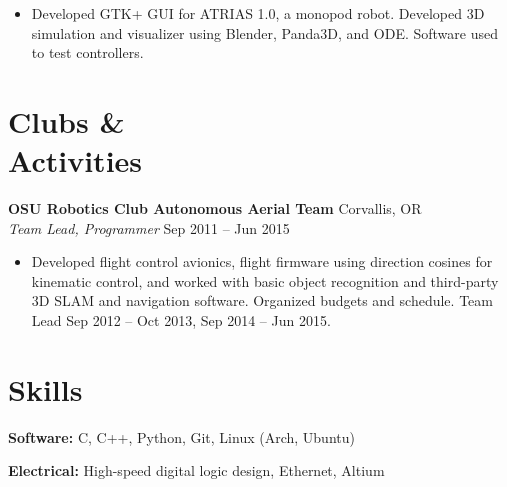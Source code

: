 \documentclass[10pt,letterpaper,margin]{res}
\newcommand{\org}[2]{{\bf #1} \hfill {\color{lightgray} #2} \\}
\newcommand{\pos}[2]{{\it #1} \hfill {\color{lightgray} #2} \vspace{0.0em}}
\begin{document}
\begin{resume}
\begin{itemize}
    \item Developed GTK+ GUI for ATRIAS 1.0, a monopod robot. Developed 3D
        simulation and visualizer using Blender, Panda3D, and ODE. Software
        used to test controllers.
\end{itemize}



\section{Clubs \& \\ Activities}

\org {OSU Robotics Club Autonomous Aerial Team} {Corvallis, OR}
\pos {Team Lead, Programmer} {Sep 2011 -- Jun 2015}

\begin{itemize}
    \item Developed flight control avionics, flight firmware using direction
      cosines for kinematic control, and worked with basic object recognition
      and third-party 3D SLAM and navigation software. Organized budgets and
      schedule. Team Lead Sep 2012 -- Oct 2013, Sep 2014 -- Jun 2015.
\end{itemize}



%
%


\section{Skills}

{\bf Software:} C, C++, Python, Git, Linux (Arch, Ubuntu)

{\bf Electrical:} High-speed digital logic design, Ethernet, Altium


% 

\end{resume}
\end{document}
